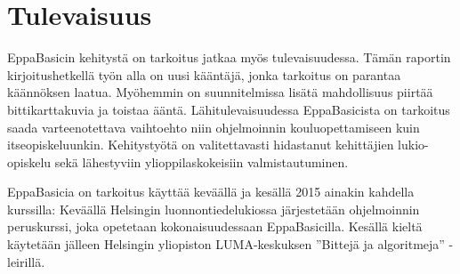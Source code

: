 \section{Tulevaisuus}
EppaBasicin kehitystä on tarkoitus
jatkaa myös tulevaisuudessa.
Tämän raportin kirjoitushetkellä työn alla
on uusi kääntäjä,
jonka tarkoitus on parantaa käännöksen laatua.
Myöhemmin on suunnitelmissa lisätä
mahdollisuus piirtää bittikarttakuvia
ja toistaa ääntä.
Lähitulevaisuudessa EppaBasicista on tarkoitus
saada varteenotettava vaihtoehto niin ohjelmoinnin
kouluopettamiseen kuin itseopiskeluunkin.
Kehitystyötä on valitettavasti hidastanut kehittäjien
lukio-opiskelu sekä lähestyviin ylioppilaskokeisiin
valmistautuminen.

EppaBasicia on tarkoitus käyttää keväällä
ja kesällä 2015 ainakin kahdella kurssilla:
Keväällä Helsingin luonnontiedelukiossa
järjestetään ohjelmoinnin peruskurssi,
joka opetetaan kokonaisuudessaan
EppaBasicilla.
Kesällä kieltä käytetään jälleen
Helsingin yliopiston LUMA-keskuksen
''Bittejä ja algoritmeja'' -leirillä.